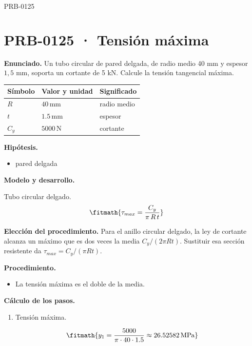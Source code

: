 \begin{studiumworked}{PRB-0125}

\section{PRB-0125 · Tensión máxima}

\textbf{Enunciado.} Un tubo circular de pared delgada, de radio medio 40 mm y espesor $1{,}5$ mm, soporta un cortante de 5 kN. Calcule la tensión tangencial máxima.

\par\medskip\noindent\begin{tabular}{@{}p{.18\linewidth}p{.26\linewidth}p{.48\linewidth}@{}}
\toprule Símbolo & Valor y unidad & Significado\\\midrule
$R$ & $40\,\mathrm{mm}$ & radio medio\\
$t$ & $1.5\,\mathrm{mm}$ & espesor\\
$C_{y}$ & $5000\,\mathrm{N}$ & cortante\\
\bottomrule\end{tabular}\par\medskip

\textbf{Hipótesis.}\begin{itemize}\item pared delgada\end{itemize}

\textbf{Modelo y desarrollo.}

Tubo circular delgado.\[\fitmath{\tau_{max} = \frac{C_y}{\pi\,R\,t}}\]

\textbf{Elección del procedimiento.} Para el anillo circular delgado, la ley de cortante alcanza un máximo que es dos veces la media $C_y/(2\pi Rt)$. Sustituir esa sección resistente da $\tau_{max}=C_y/(\pi Rt)$.

\textbf{Procedimiento.}\begin{itemize}\item La tensión máxima es el doble de la media.\end{itemize}

\textbf{Cálculo de los pasos.}

\begin{enumerate}

\item Tensión máxima.

\[\fitmath{y_{1}=\frac{5000}{\pi\cdot 40\cdot 1.5}\approx 26.52582\,\mathrm{MPa}}\]

\end{enumerate}


\end{studiumworked}
